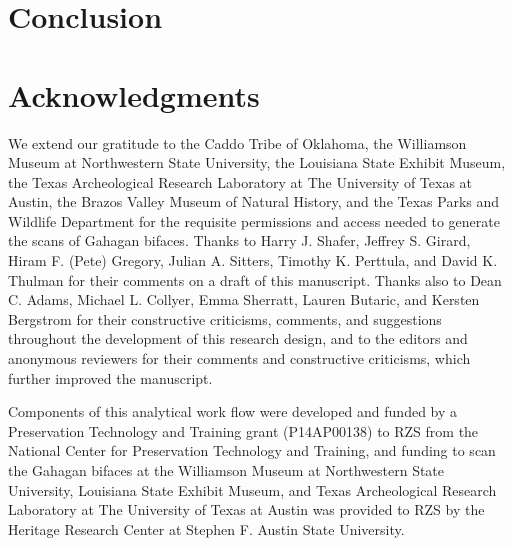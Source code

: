\documentclass[review]{elsarticle}
\begin{document}
\section*{Conclusion}

\section*{Acknowledgments}

We extend our gratitude to the Caddo Tribe of Oklahoma, the Williamson Museum at Northwestern State University, the Louisiana State Exhibit Museum, the Texas Archeological Research Laboratory at The University of Texas at Austin, the Brazos Valley Museum of Natural History, and the Texas Parks and Wildlife Department for the requisite permissions and access needed to generate the scans of Gahagan bifaces. Thanks to Harry J. Shafer, Jeffrey S. Girard, Hiram F. (Pete) Gregory, Julian A. Sitters, Timothy K. Perttula, and David K. Thulman for their comments on a draft of this manuscript. Thanks also to Dean C. Adams, Michael L. Collyer, Emma Sherratt, Lauren Butaric, and Kersten Bergstrom for their constructive criticisms, comments, and suggestions throughout the development of this research design, and to the editors and anonymous reviewers for their comments and constructive criticisms, which further improved the manuscript.

Components of this analytical work flow were developed and funded by a Preservation Technology and Training grant (P14AP00138) to RZS from the National Center for Preservation Technology and Training, and funding to scan the Gahagan bifaces at the Williamson Museum at Northwestern State University, Louisiana State Exhibit Museum, and Texas Archeological Research Laboratory at The University of Texas at Austin was provided to RZS by the Heritage Research Center at Stephen F. Austin State University.


\end{document}
